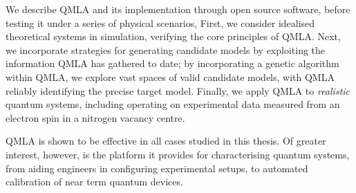 We describe QMLA and its implementation through open source software,
    before testing it under a series of physical scenarios, 
First, we consider idealised theoretical systems in simulation, 
    verifying the core principles of QMLA. 
Next, we incorporate strategies for generating candidate models
    by exploiting the information QMLA has gathered to date;
    by incorporating a genetic algorithm within QMLA, 
    we explore vast spaces of valid candidate models, with QMLA reliably identifying the precise target model.
Finally, we apply QMLA to \emph{realistic} quantum systems, 
    including operating on experimental data measured from an electron spin in a nitrogen vacancy centre. 

\par 

QMLA is shown to be effective in all cases studied in this thesis.
Of greater interest, however, is the platform it provides for characterising quantum systems,
    from aiding engineers in configuring experimental setups, 
    to automated calibration of near term quantum devices. 



